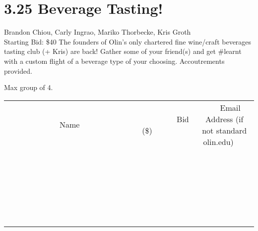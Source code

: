 \documentclass[11pt]{article}
\begin{document}
\section*{3.25 Beverage Tasting!}
Brandon Chiou, Carly Ingrao, Mariko Thorbecke, Kris Groth
\\
Starting Bid: \$40
\newline
The founders of Olin's only chartered fine wine/craft beverages tasting club (+ Kris) are back! Gather some of your friend(s) and get \#learnt with a custom flight of a beverage type of your choosing. Accoutrements provided.

Max group of 4.
\\[6ex]
\begin{tabular}{c c c}
~~~~~~~~~~~~~Name~~~~~~~~~~~~~ & ~~~~~~~~~Bid (\$)~~~~~~~~~  & ~~~Email Address (if not standard olin.edu)~~~\\
 & & \\
\hline
 & & \\
\hline
 & & \\
\hline
 & & \\
\hline
 & & \\
\hline
 & & \\
\hline
 & & \\
\hline
 & & \\
\hline
 & & \\
\hline
 & & \\
\hline
 & & \\
\hline
 & & \\
\hline
 & & \\
\hline
 & & \\
\hline
 & & \\
\hline
 & & \\
\hline
 & & \\
\hline
 & & \\
\hline
 & & \\
\hline
 & & \\
\hline
 & & \\
\hline
 & & \\
\hline
 & & \\
\hline
 & & \\
\hline
 & & \\
\hline
 & & \\
\hline
\end{tabular}
\newpage
\end{document}
